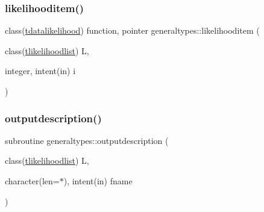\mbox{\label{namespacegeneraltypes_aaebd3447ba557d8cc1c3f2b5ca98456d}} 
\subsubsection{\texorpdfstring{likelihooditem()}{likelihooditem()}}
{\footnotesize\ttfamily class(\mbox{\hyperlink{structgeneraltypes_1_1tdatalikelihood}{tdatalikelihood}}) function, pointer generaltypes\+::likelihooditem (\begin{DoxyParamCaption}\item[{class(\mbox{\hyperlink{structgeneraltypes_1_1tlikelihoodlist}{tlikelihoodlist}})}]{L,  }\item[{integer, intent(in)}]{i }\end{DoxyParamCaption})\hspace{0.3cm}{\ttfamily [private]}}

\mbox{\label{namespacegeneraltypes_a99af409a28645f773f5a94f32df68365}} 
\subsubsection{\texorpdfstring{outputdescription()}{outputdescription()}}
{\footnotesize\ttfamily subroutine generaltypes\+::outputdescription (\begin{DoxyParamCaption}\item[{class(\mbox{\hyperlink{structgeneraltypes_1_1tlikelihoodlist}{tlikelihoodlist}})}]{L,  }\item[{character(len=$\ast$), intent(in)}]{fname }\end{DoxyParamCaption})\hspace{0.3cm}{\ttfamily [private]}}

\mbox{\label{namespacegeneraltypes_a416bb37c1c9b61ae49640747ff4b7630}} 
